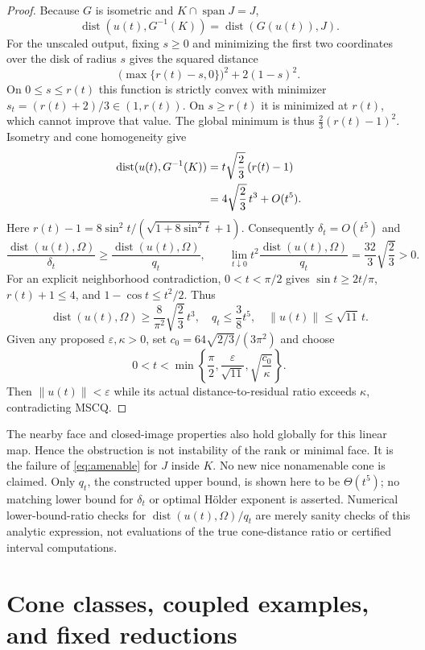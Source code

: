\documentclass[11pt]{article}
\numberwithin{equation}{section}
\theoremstyle{definition}
\theoremstyle{remark}
\DeclareMathOperator{\dist}{dist}
\DeclareMathOperator{\spann}{span}
\newcommand{\norm}[1]{\lVert #1\rVert}
\newcommand{\dset}[2]{\dist(#1,#2)}
\begin{document}
\begin{proof}
Because $G$ is isometric and $K\cap\spann J=J$,
\[
 \dset{u(t)}{G^{-1}(K)}=\dset{G(u(t))}{J}.
\]
For the unscaled output, fixing $s\geq0$ and minimizing the first two
coordinates over the disk of radius $s$ gives the squared distance
\[
 \bigl(\max\{r(t)-s,0\}\bigr)^2+2(1-s)^2.
\]
On $0\leq s\leq r(t)$ this function is strictly convex with minimizer
$s_t=(r(t)+2)/3\in(1,r(t))$. On $s\geq r(t)$ it is minimized at
$r(t)$, which cannot improve that value. The global minimum is thus
$\frac23(r(t)-1)^2$. Isometry and cone homogeneity give
\begin{align}
 \dset{u(t)}{G^{-1}(K)}
 &=t\sqrt{\frac23}\,(r(t)-1)\notag\\
 &=4\sqrt{\frac23}\,t^3+O(t^5).
 \label{eq:large-distance}
\end{align}
Here $r(t)-1=8\sin^2t/(\sqrt{1+8\sin^2t}+1)$.
Consequently $\delta_t=O(t^5)$ and
\[
 \frac{\dset{u(t)}{\Omega}}{\delta_t}
 \geq\frac{\dset{u(t)}{\Omega}}{q_t},\qquad
 \lim_{t\downarrow0}t^2\frac{\dset{u(t)}{\Omega}}{q_t}
 =\frac{32}{3}\sqrt{\frac23}>0.
\]
For an explicit neighborhood contradiction, $0<t<\pi/2$ gives
$\sin t\geq2t/\pi$, $r(t)+1\leq4$, and
$1-\cos t\leq t^2/2$. Thus
\[
 \dset{u(t)}{\Omega}\geq\frac8{\pi^2}\sqrt{\frac23}\,t^3,
 \quad q_t\leq\frac38t^5,
 \quad \norm{u(t)}\leq\sqrt{11}\,t.
\]
Given any proposed $\varepsilon,\kappa>0$, set
$c_0=64\sqrt{2/3}/(3\pi^2)$ and choose
\[
 0<t<\min\left\{\frac\pi2,\frac{\varepsilon}{\sqrt{11}},
                  \sqrt{\frac{c_0}{\kappa}}\right\}.
\]
Then $\norm{u(t)}<\varepsilon$ while its actual distance-to-residual
ratio exceeds $\kappa$, contradicting MSCQ.
\end{proof}

The nearby face and closed-image properties also hold globally for this
linear map. Hence the obstruction is not instability of the rank or
minimal face. It is the failure of \eqref{eq:amenable} for $J$ inside $K$.
No new nice nonamenable cone is claimed. Only $q_t$, the constructed
upper bound, is shown here to be $\Theta(t^5)$; no matching lower bound
for $\delta_t$ or optimal H\"older exponent is asserted. Numerical
lower-bound-ratio checks for $\dset{u(t)}{\Omega}/q_t$ are merely
sanity checks of this analytic expression, not evaluations of the true
cone-distance ratio or certified interval computations.

\section{Cone classes, coupled examples, and fixed reductions}
\label{sec:examples}
\end{document}
